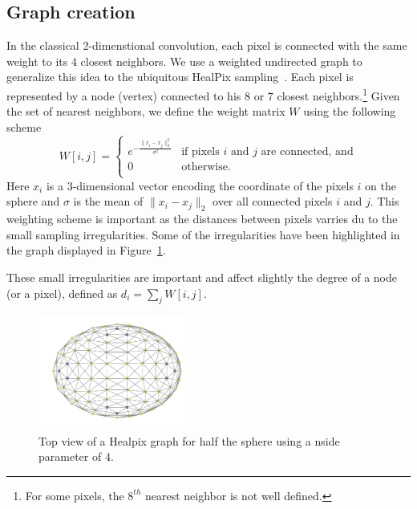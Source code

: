 \documentclass[preprint,12pt,authoryear]{elsarticle}
\newcommand{\1}{\b{1}}              %
\newcommand{\0}{\b{0}}              %
\begin{document}
\subsection{Graph creation}
In the classical 2-dimenstional convolution, each pixel is connected with the
same weight to its 4 closest neighbors. We use a weighted undirected graph to
generalize this idea to the ubiquitous HealPix
sampling~\citep{gorski2005healpix}.  Each pixel is represented by a node
(vertex) connected to his $8$ or $7$ closest neighbors.\footnote{For some
pixels, the $8^{th}$ nearest neighbor is not well defined.} Given the set of
nearest neighbors, we define the weight matrix $W$ using the following scheme
\begin{equation}
W[i,j]=\begin{cases}
e^{-\frac{\|x_i-x_j\|_2^2}{\sigma^2}} & \text{if pixels $i$ and $j$ are connected, and}\\
0 & \text{otherwise.}\\
\end{cases}
\end{equation}
Here $x_i$ is a 3-dimensional vector encoding the coordinate of the pixels $i$
on the sphere and $\sigma$ is the mean of $\|x_i-x_j\|_2$ over all connected
pixels $i$ and $j$. This weighting scheme is important as the distances between
pixels varries du to the small sampling irregularities. Some of the
irregularities have been highlighted in the graph displayed in
Figure~\ref{fig:healpix_graph_4}.

These small irregularities are important and affect slightly the degree of a 
node (or a pixel), defined as $d_i =\sum_j W[i,j]$. 

\begin{figure}[!ht]
\centering
\vspace{-0.5cm}
\includegraphics[width=0.45\textwidth]{figures/half_graph_4.pdf}
\vspace{-0.5cm}
\caption{
Top view of a Healpix graph for half the sphere using a nside parameter of $4$.}
\label{fig:healpix_graph_4}
\end{figure}
\end{document}
